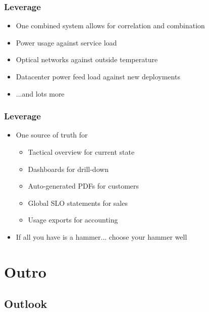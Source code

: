 \documentclass[t]{beamer}
\begin{document}
\begin{frame}
	\frametitle{Leverage}
	\begin{itemize}
		\item One combined system allows for correlation and combination
		\item Power usage against service load
		\item Optical networks against outside temperature
		\item Datacenter power feed load against new deployments
		\item ...and lots more
	\end{itemize}
\end{frame}

\begin{frame}
	\frametitle{Leverage}
	\begin{itemize}
		\item One source of truth for
		\begin{itemize}
			\item Tactical overview for current state
			\item Dashboards for drill-down
			\item Auto-generated PDFs for customers
			\item Global SLO statements for sales
			\item Usage exports for accounting
		\end{itemize}
	\item If all you have is a hammer... choose your hammer well
	\end{itemize}
\end{frame}



\section{Outro}

\subsection{Outlook}
\end{document}
